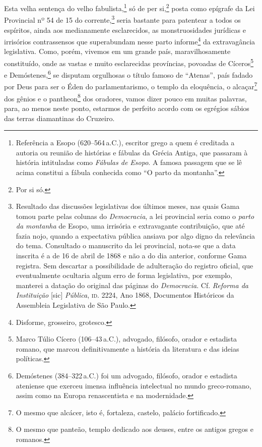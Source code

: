 Esta velha sentença do velho fabulista,\footnote{Referência a Esopo
  (620--564\,a.C.), escritor grego a quem é creditada a autoria ou reunião
  de histórias e fábulas da Grécia Antiga, que passaram à história
  intituladas como \emph{Fábulas de Esopo}. A famosa passagem que se lê
  acima constitui a fábula conhecida como ``O parto da montanha''.}
só de per si,\footnote{Por si só.} posta como epígrafe da Lei
Provincial nº 54 de 15 do corrente,\footnote{Resultado das discussões
  legislativas dos últimos meses, nas quais Gama tomou parte pelas
  colunas do \emph{Democracia}, a lei provincial seria como o
  \emph{parto da montanha} de Esopo, uma irrisória e extravagante
  contribuição, que até fazia nojo, quando a expectativa pública ansiava
  por algo digno da relevância do tema. Consultado o manuscrito da lei
  provincial, nota-se que a data inscrita é a de 16 de abril de 1868 e não a do
  dia anterior, conforme Gama registra. Sem descartar a possibilidade de
  adulteração do registro oficial, que eventualmente ocultaria algum
  erro de forma legislativa, por exemplo, manterei a datação do original
  das páginas do \emph{Democracia}. Cf. \emph{Reforma da Instituição}
  {[}sic{]} \emph{Pública}, \textsc{id}. 2224, Ano 1868, Documentos Históricos da
  Assembleia Legislativa de São Paulo.} seria bastante para patentear a
todos os espíritos, ainda aos medianamente esclarecidos, as
monstruosidades jurídicas e irrisórios contrassensos que superabundam
nesse parto informe\footnote{Disforme, grosseiro, grotesco.} da
extravagância legislativa. Como, porém, vivemos em um grande país,
maravilhosamente constituído, onde as vastas e muito esclarecidas
províncias, povoadas de Cíceros\footnote{Marco Túlio Cícero (106--43\,a.C.), 
advogado, filósofo, orador e estadista romano, que
  marcou definitivamente a história da literatura e das ideias
  políticas.} e Demóstenes,\footnote{Demóstenes (384--322\,a.C.) foi\label{demostenes}
  um advogado, filósofo, orador e estadista ateniense que exerceu imensa
  influência intelectual no mundo greco-romano, assim como na Europa
  renascentista e na modernidade.} se disputam orgulhosas o título
famoso de ``Atenas'', país fadado por Deus para ser o Éden do
parlamentarismo, o templo da eloquência, o alcaçar\footnote{O mesmo
  que alcácer, isto é, fortaleza, castelo, palácio fortificado.} dos
gênios e o pantheon\footnote{O mesmo que panteão, templo dedicado aos
  deuses, entre os antigos gregos e romanos.} dos oradores, vamos dizer
pouco em muitas palavras, para, ao menos neste ponto, estarmos de
perfeito acordo com os egrégios sábios das terras diamantinas do
Cruzeiro.


